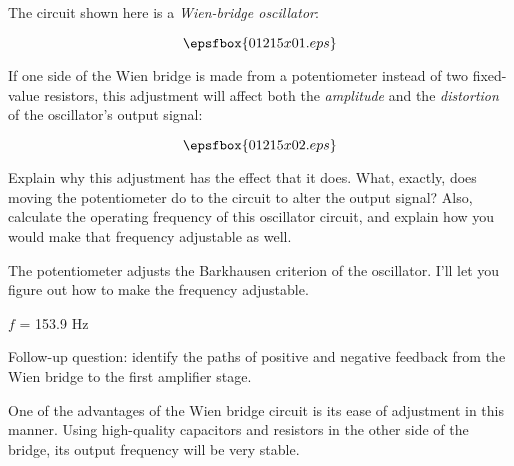 

The circuit shown here is a {\it Wien-bridge oscillator}:

$$\epsfbox{01215x01.eps}$$

If one side of the Wien bridge is made from a potentiometer instead of two fixed-value resistors, this adjustment will affect both the {\it amplitude} and the {\it distortion} of the oscillator's output signal:

$$\epsfbox{01215x02.eps}$$

Explain why this adjustment has the effect that it does.  What, exactly, does moving the potentiometer do to the circuit to alter the output signal?  Also, calculate the operating frequency of this oscillator circuit, and explain how you would make that frequency adjustable as well.







The potentiometer adjusts the Barkhausen criterion of the oscillator.  I'll let you figure out how to make the frequency adjustable.

\vskip 10pt

$f$ = 153.9 Hz

\vskip 10pt

Follow-up question: identify the paths of positive and negative feedback from the Wien bridge to the first amplifier stage.







One of the advantages of the Wien bridge circuit is its ease of adjustment in this manner.  Using high-quality capacitors and resistors in the other side of the bridge, its output frequency will be very stable.




